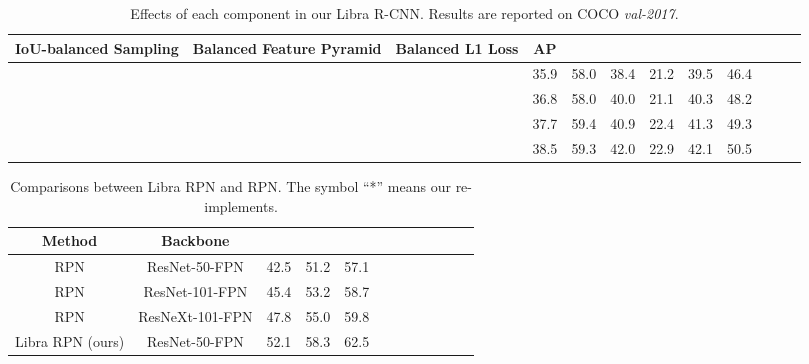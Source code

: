 \documentclass[10pt,twocolumn,letterpaper]{article}
\begin{document}
\begin{table*}[htb]
	\centering
	\caption{Effects of each component in our Libra R-CNN. Results are reported on COCO \emph{val-2017}.}
	\vspace{0.1cm}
	\addtolength{\tabcolsep}{0pt}
	\begin{tabular}{*{12}{c}}
		\toprule
		IoU-balanced Sampling & Balanced Feature Pyramid & Balanced L1 Loss & AP   &  &  &  &  &  \\
		\midrule
		                      &                          &                  & 35.9 & 58.0             & 38.4             & 21.2            & 39.5            & 46.4            \\
		\checkmark            &                          &                  & 36.8 & 58.0             & 40.0             & 21.1            & 40.3            & 48.2            \\
		\checkmark            & \checkmark               &                  & 37.7 & 59.4             & 40.9             & 22.4            & 41.3            & 49.3            \\
		\checkmark            & \checkmark               & \checkmark       & 38.5 & 59.3             & 42.0             & 22.9            & 42.1            & 50.5            \\
		\bottomrule
	\end{tabular}
	\label{tab:overall-ablation}
\end{table*}


\begin{table}[htb]
	\centering
	\caption{Comparisons between Libra RPN and RPN. The symbol ``*'' means our re-implements.}
	\vspace{-2pt}
	\addtolength{\tabcolsep}{-5pt}
	\begin{tabular}{*{12}{c}}
		\toprule
		Method           & Backbone        &  &  &  \\
		\midrule
		RPN          & ResNet-50-FPN   & 42.5              & 51.2              & 57.1               \\
		RPN          & ResNet-101-FPN  & 45.4              & 53.2              & 58.7               \\
		RPN          & ResNeXt-101-FPN & 47.8              & 55.0              & 59.8               \\
		\midrule
		Libra RPN (ours) & ResNet-50-FPN   & 52.1              & 58.3              & 62.5               \\
		\bottomrule
	\end{tabular}
	\label{tab:rpn}
\end{table}
\end{document}
